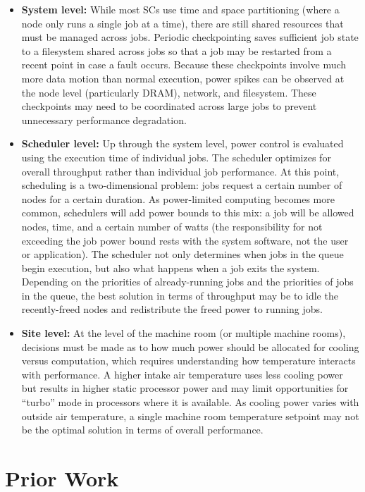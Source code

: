 \begin{itemize}
\item \textbf{System level:} While most SCs use time and space partitioning (where a node
only runs a single job at a time), there are still shared resources that must be managed
across jobs. Periodic checkpointing saves sufficient job state to a filesystem shared 
across jobs so that a job may be restarted from a recent point in case a fault occurs.
Because these checkpoints involve much more data motion than normal execution, power 
spikes can be observed at the node level (particularly DRAM), network, and filesystem.
These checkpoints may need to be coordinated across large jobs to prevent unnecessary
performance degradation.

\item \textbf{Scheduler level:} Up through the system level, power control is evaluated
using the execution time of individual jobs. The scheduler optimizes for overall throughput
rather than individual job performance. At this point, scheduling is a two-dimensional 
problem: jobs request a certain number of nodes for a certain duration. As power-limited
computing becomes more common, schedulers will add power bounds to this mix: a job will
be allowed nodes, time, and a certain number of watts (the responsibility for not exceeding
the job power bound rests with the system software, not the user or application). The 
scheduler not only determines when jobs in the queue begin execution, but also what happens
when a job exits the system. Depending on the priorities of already-running jobs and the
priorities of jobs in the queue, the best solution in terms of throughput may be to idle
the recently-freed nodes and redistribute the freed power to running jobs.

\item \textbf{Site level:} At the level of the machine room (or multiple machine rooms),
decisions must be made as to how much power should be allocated for cooling versus computation, which requires understanding how temperature interacts with performance. A higher intake air temperature uses less cooling power but results in higher static processor power and may limit opportunities for ``turbo'' mode in processors where it is available. As cooling power varies with outside air temperature, a single machine room temperature setpoint may not be the optimal solution in terms of overall performance. 
\end{itemize}



\section{Prior Work}
\label{sub:priorwork}


